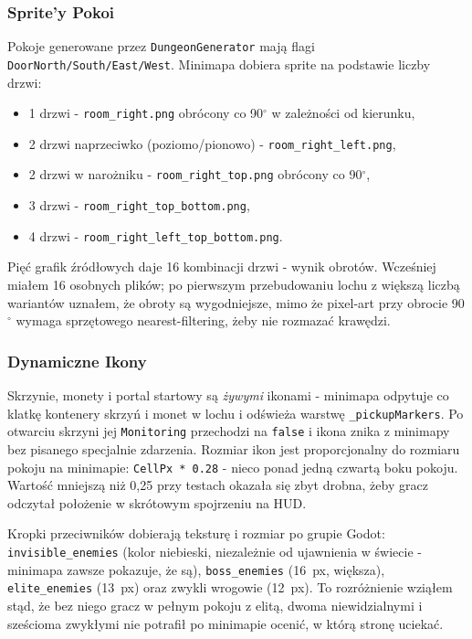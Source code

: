 \subsubsection{Sprite'y Pokoi}

Pokoje generowane przez \texttt{DungeonGenerator} mają flagi \texttt{DoorNorth/South/East/West}. Minimapa dobiera sprite na podstawie liczby drzwi:

\begin{itemize}
    \item 1 drzwi - \texttt{room\_right.png} obrócony co 90$^\circ$ w zależności od kierunku,
    \item 2 drzwi naprzeciwko (poziomo/pionowo) - \texttt{room\_right\_left.png},
    \item 2 drzwi w narożniku - \texttt{room\_right\_top.png} obrócony co 90$^\circ$,
    \item 3 drzwi - \texttt{room\_right\_top\_bottom.png},
    \item 4 drzwi - \texttt{room\_right\_left\_top\_bottom.png}.
\end{itemize}

Pięć grafik źródłowych daje 16 kombinacji drzwi - wynik obrotów. Wcześniej miałem 16 osobnych plików; po pierwszym przebudowaniu lochu z większą liczbą wariantów uznałem, że obroty są wygodniejsze, mimo że pixel-art przy obrocie 90$^\circ$ wymaga sprzętowego nearest-filtering, żeby nie rozmazać krawędzi.

\subsubsection{Dynamiczne Ikony}

Skrzynie, monety i portal startowy są \emph{żywymi} ikonami - minimapa odpytuje co klatkę kontenery skrzyń i monet w lochu i odświeża warstwę \texttt{\_pickupMarkers}. Po otwarciu skrzyni jej \texttt{Monitoring} przechodzi na \texttt{false} i ikona znika z minimapy bez pisanego specjalnie zdarzenia. Rozmiar ikon jest proporcjonalny do rozmiaru pokoju na minimapie: \texttt{CellPx * 0.28} - nieco ponad jedną czwartą boku pokoju. Wartość mniejszą niż 0,25 przy testach okazała się zbyt drobna, żeby gracz odczytał położenie w skrótowym spojrzeniu na HUD.

Kropki przeciwników dobierają teksturę i rozmiar po grupie Godot: \texttt{invisible\_enemies} (kolor niebieski, niezależnie od ujawnienia w świecie - minimapa zawsze pokazuje, że są), \texttt{boss\_enemies} (16~px, większa), \texttt{elite\_enemies} (13~px) oraz zwykli wrogowie (12~px). To rozróżnienie wziąłem stąd, że bez niego gracz w pełnym pokoju z elitą, dwoma niewidzialnymi i sześcioma zwykłymi nie potrafił po minimapie ocenić, w którą stronę uciekać.

